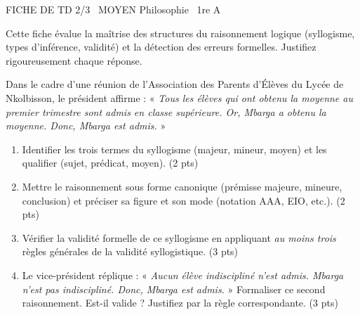 \documentclass[11pt]{article}
\begin{document}
\begin{tcolorbox}[enhanced,colback=popink,colframe=popink,arc=10pt,boxrule=0pt,left=12pt,right=12pt,top=9pt,bottom=9pt]
{\color{white}\popxbold\small FICHE DE TD 2/3 \textbullet\ MOYEN \hfill Philosophie \textbullet\ 1re A\par}
\end{tcolorbox}
\vspace{4pt}
\noindent Cette fiche évalue la maîtrise des structures du raisonnement logique (syllogisme, types d'inférence, validité) et la détection des erreurs formelles. Justifiez rigoureusement chaque réponse.

\begin{exercice}
Dans le cadre d'une réunion de l'Association des Parents d'Élèves du Lycée de Nkolbisson, le président affirme : « \textit{Tous les élèves qui ont obtenu la moyenne au premier trimestre sont admis en classe supérieure. Or, Mbarga a obtenu la moyenne. Donc, Mbarga est admis.} »
\begin{enumerate}
    \item Identifier les trois termes du syllogisme (majeur, mineur, moyen) et les qualifier (sujet, prédicat, moyen). (2 pts)
    \item Mettre le raisonnement sous forme canonique (prémisse majeure, mineure, conclusion) et préciser sa figure et son mode (notation AAA, EIO, etc.). (2 pts)
    \item Vérifier la validité formelle de ce syllogisme en appliquant \textit{au moins trois} règles générales de la validité syllogistique. (3 pts)
    \item Le vice-président réplique : « \textit{Aucun élève indiscipliné n'est admis. Mbarga n'est pas indiscipliné. Donc, Mbarga est admis.} » Formaliser ce second raisonnement. Est-il valide ? Justifiez par la règle correspondante. (3 pts)
\end{enumerate}
\end{exercice}
\end{document}
